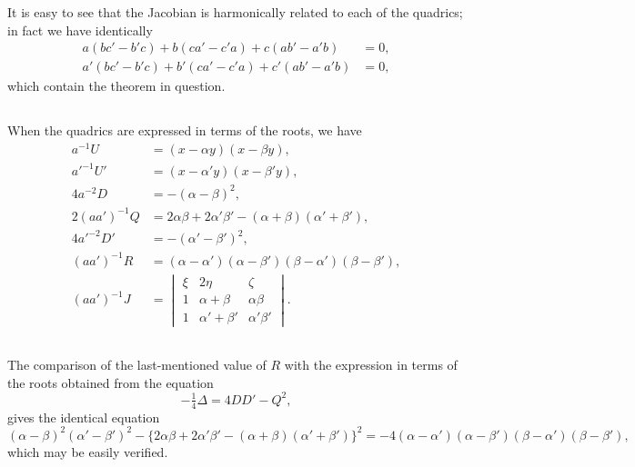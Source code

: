 \documentclass[12pt,a4paper]{article}
\begin{document}
It is easy to see that the Jacobian is harmonically related to each of the quadrics; in fact we have identically
\begin{align*}
a(bc' - b'c) + b(ca' - c'a) + c(ab' - a'b) &= 0,\\
a'(bc' - b'c) + b'(ca' - c'a) + c'(ab' - a'b) &= 0,
\end{align*}
which contain the theorem in question.

\subsection{}

When the quadrics are expressed in terms of the roots, we have
\begin{align*}
a^{-1}U &= (x - \alpha y)(x - \beta y),\\
a'^{-1}U' &= (x - \alpha' y)(x - \beta' y),\\
4a^{-2}D &= -(\alpha - \beta)^2,\\
2(aa')^{-1}Q &= 2\alpha\beta + 2\alpha'\beta' - (\alpha + \beta)(\alpha' + \beta'),\\
4a'^{-2}D' &= -(\alpha' - \beta')^2,\\
(aa')^{-1}R &= (\alpha - \alpha')(\alpha - \beta')(\beta - \alpha')(\beta - \beta'),\\
(aa')^{-1}J &=
\begin{vmatrix}
\xi & 2\eta & \zeta \\
1 & \alpha + \beta & \alpha\beta \\
1 & \alpha' + \beta' & \alpha'\beta'
\end{vmatrix}.
\end{align*}

\subsection{}

The comparison of the last-mentioned value of $R$ with the expression in terms of the roots obtained from the equation
\[
-\tfrac{1}{4}\Delta = 4DD' - Q^2,
\]
gives the identical equation
\[
(\alpha - \beta)^2(\alpha' - \beta')^2 - \{2\alpha\beta + 2\alpha'\beta' - (\alpha + \beta)(\alpha' + \beta')\}^2 = -4(\alpha - \alpha')(\alpha - \beta')(\beta - \alpha')(\beta - \beta'),
\]
which may be easily verified.

\subsection{}
\end{document}
